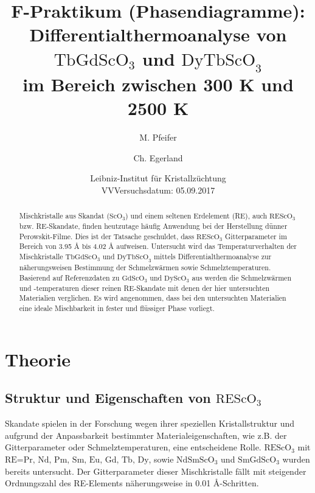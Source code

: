 \documentclass[aps,twocolumn,secnumarabic,nobalancelastpage,amsmath,amssymb,
nofootinbib,superscriptaddress]{revtex4-1}
\begin{document}
\title{F-Praktikum (Phasendiagramme):\\Differentialthermoanalyse von $\text{TbGdScO}_3$
und $\text{DyTbScO}_3$\\im Bereich zwischen 300 K und 2500 K}
\author         {M. Pfeifer}
\author         {Ch. Egerland}
\date[Versuchsort: ]{Leibniz-Institut für Kristallzüchtung \\ VVVersuchsdatum: 05.09.2017}


\begin{abstract}
Mischkristalle aus Skandat ($\text{ScO}_3$) und einem seltenen Erdelement (RE), auch $\text{REScO}_3$ bzw. RE-Skandate, finden heutzutage häufig Anwendung bei der Herstellung
dünner Perowskit-Filme. Dies ist der Tatsache geschuldet, dass $\text{REScO}_3$ Gitterparameter im Bereich von 3.95 \AA$\text{ bis}$ 4.02 \AA$\text{ aufweisen.}$
 Untersucht wird das Temperaturverhalten der Mischkristalle $\text{TbGdScO}_3$ und $\text{DyTbScO}_3$ mittels
Differentialthermoanalyse zur näherungsweisen Bestimmung der Schmelzwärmen sowie Schmelztemperaturen.
Basierend auf Referenzdaten zu $\text{Gd}\text{ScO}_3$ und $\text{Dy}\text{ScO}_3$ aus \cite{paperK} werden die Schmelzwärmen und -temperaturen dieser
reinen RE-Skandate mit denen der hier untersuchten Materialien verglichen. Es wird angenommen, dass bei den untersuchten Materialien eine ideale Mischbarkeit in fester und
flüssiger Phase vorliegt.

\end{abstract}


\maketitle


\section{Theorie}
\subsection{Struktur und Eigenschaften von $\text{REScO}_3$}
\noindent Skandate spielen in der Forschung wegen ihrer speziellen Kristallstruktur und aufgrund der Anpassbarkeit bestimmter Materialeigenschaften, wie z.B. der
Gitterparameter oder Schmelztemperaturen, eine entscheidene Rolle. $\text{REScO}_3$ mit $\text{RE=Pr, Nd, Pm, Sm, Eu, Gd, Tb, Dy}$, sowie $\text{NdSmScO}_3$ und $\text{SmGdScO}_3$ wurden bereits untersucht.
Der Gitterparameter dieser Mischkristalle fällt mit steigender Ordnungszahl des RE-Elements näherungsweise in 0.01 \AA-Schritten. \cite{paperK}
\end{document}
